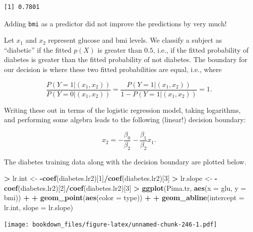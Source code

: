 \documentclass[
]{krantz}
\makeatletter
\newenvironment{Shaded}{\begin{snugshade}}{\end{snugshade}}
\newcommand{\DataTypeTok}[1]{\textcolor[rgb]{0.27,0.27,0.27}{#1}}
\newcommand{\DecValTok}[1]{\textcolor[rgb]{0.06,0.06,0.06}{#1}}
\newcommand{\KeywordTok}[1]{\textcolor[rgb]{0.27,0.27,0.27}{\textbf{#1}}}
\newcommand{\NormalTok}[1]{#1}
\newcommand{\OperatorTok}[1]{\textcolor[rgb]{0.43,0.43,0.43}{\textbf{#1}}}
\newcommand{\StringTok}[1]{\textcolor[rgb]{0.5,0.5,0.5}{#1}}
\newenvironment{kframe}{%
\medskip{}
\setlength{\fboxsep}{.8em}
 \def\at@end@of@kframe{}%
 \ifinner\ifhmode%
  \def\at@end@of@kframe{\end{minipage}}%
  \begin{minipage}{\columnwidth}%
 \fi\fi%
 \def\FrameCommand##1{\hskip\@totalleftmargin \hskip-\fboxsep
 \colorbox{shadecolor}{##1}\hskip-\fboxsep
     \hskip-\linewidth \hskip-\@totalleftmargin \hskip\columnwidth}%
 \MakeFramed {\advance\hsize-\width
   \@totalleftmargin\z@ \linewidth\hsize
   \@setminipage}}%
 {\par\unskip\endMakeFramed%
 \at@end@of@kframe}
\renewenvironment{Shaded}{\begin{kframe}}{\end{kframe}}
\makeatother
\begin{document}
\begin{verbatim}
[1] 0.7801
\end{verbatim}

Adding \texttt{bmi} as a predictor did not improve the predictions by very much!

Let \(x_1\) and \(x_2\) represent glucose and bmi levels. We classify a subject as ``diabetic'' if the fitted \(p(X)\) is greater than \(0.5\), i.e., if the fitted probability of diabetes is greater than the fitted probability of not diabetes. The boundary for our decision is where these two fitted probabilities are equal, i.e., where

\[
\frac{P(Y = 1 | (x_1, x_2))}{P(Y = 0 | (x_1, x_2))} = \frac{P(Y = 1 | (x_1, x_2))}{1 - P(Y = 1 | (x_1, x_2))}  = 1.
\]

Writing these out in terms of the logistic regression model, taking logarithms, and performing some algebra leads to the following (linear!) decision boundary:

\[
x_2 = -\frac{\beta_0}{\beta_2} - \frac{\beta_1}{\beta_2} x_1.
\]

The diabetes training data along with the decision boundary are plotted below.

\begin{Shaded}
\begin{Highlighting}[]
\OperatorTok{\textgreater{}}\StringTok{ }\NormalTok{lr.int \textless{}{-}}\StringTok{ }\OperatorTok{{-}}\KeywordTok{coef}\NormalTok{(diabetes.lr2)[}\DecValTok{1}\NormalTok{]}\OperatorTok{/}\KeywordTok{coef}\NormalTok{(diabetes.lr2)[}\DecValTok{3}\NormalTok{]}
\OperatorTok{\textgreater{}}\StringTok{ }\NormalTok{lr.slope \textless{}{-}}\StringTok{ }\OperatorTok{{-}}\KeywordTok{coef}\NormalTok{(diabetes.lr2)[}\DecValTok{2}\NormalTok{]}\OperatorTok{/}\KeywordTok{coef}\NormalTok{(diabetes.lr2)[}\DecValTok{3}\NormalTok{]}
\OperatorTok{\textgreater{}}\StringTok{ }\KeywordTok{ggplot}\NormalTok{(Pima.tr, }\KeywordTok{aes}\NormalTok{(}\DataTypeTok{x =}\NormalTok{ glu, }\DataTypeTok{y =}\NormalTok{ bmi)) }\OperatorTok{+}\StringTok{ }
\OperatorTok{+}\StringTok{   }\KeywordTok{geom\_point}\NormalTok{(}\KeywordTok{aes}\NormalTok{(}\DataTypeTok{color =}\NormalTok{ type)) }\OperatorTok{+}\StringTok{ }
\OperatorTok{+}\StringTok{   }\KeywordTok{geom\_abline}\NormalTok{(}\DataTypeTok{intercept =}\NormalTok{ lr.int, }\DataTypeTok{slope =}\NormalTok{ lr.slope)}
\end{Highlighting}
\end{Shaded}

\texttt{[image: bookdown\_files/figure-latex/unnamed-chunk-246-1.pdf]}
\end{document}
